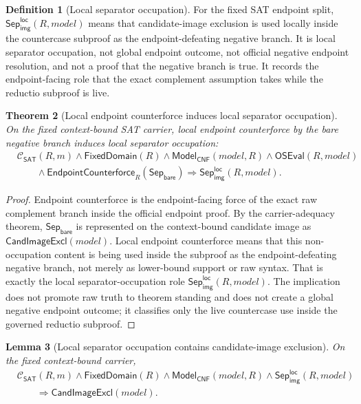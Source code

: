 \documentclass[11pt]{article}
\newtheorem{theorem}{Theorem}[section]
\newtheorem{lemma}[theorem]{Lemma}
\theoremstyle{definition}
\newtheorem{definition}[theorem]{Definition}
\theoremstyle{remark}
\newcommand{\SepBare}{\mathsf{Sep}_{\mathsf{bare}}}
\newcommand{\LocalSepImgOcc}{\mathsf{Sep}_{\mathsf{img}}^{\mathsf{loc}}}
\newcommand{\ClayCtx}{\mathcal{C}_{\mathsf{SAT}}(R,m)}
\newcommand{\FixedDom}{\mathsf{FixedDomain}}
\newcommand{\ModelOfCnf}{\mathsf{Model}_{\mathsf{CNF}}}
\newcommand{\CandImageExcl}{\mathsf{CandImageExcl}}
\newcommand{\OfficialSATEval}{\mathsf{OSEval}}
\newcommand{\EndpointCounterforce}{\mathsf{EndpointCounterforce}}
\begin{document}
\begin{definition}[Local separator occupation]
\label{def:local-separator-occupation}
For the fixed SAT endpoint split, \(\LocalSepImgOcc(R,model)\) means that candidate-image exclusion is used locally inside the countercase subproof as the endpoint-defeating negative branch. It is local separator occupation, not global endpoint outcome, not official negative endpoint resolution, and not a proof that the negative branch is true. It records the endpoint-facing role that the exact complement assumption takes while the reductio subproof is live.
\end{definition}

\begin{theorem}[Local endpoint counterforce induces local separator occupation]
\label{thm:local-counterforce-induces-local-separator-occupation}
On the fixed context-bound SAT carrier, local endpoint counterforce by the bare negative branch induces local separator occupation:
\[
\begin{aligned}
  &\ClayCtx\wedge\FixedDom(R)\wedge\ModelOfCnf(model,R)\wedge\OfficialSATEval(R,model)\\
  &\qquad\wedge\EndpointCounterforce_R(\SepBare)\Rightarrow \LocalSepImgOcc(R,model).
\end{aligned}
\]
\end{theorem}

\begin{proof}
Endpoint counterforce is the endpoint-facing force of the exact raw complement branch inside the official endpoint proof. By the carrier-adequacy theorem, \(\SepBare\) is represented on the context-bound candidate image as \(\CandImageExcl(model)\). Local endpoint counterforce means that this non-occupation content is being used inside the subproof as the endpoint-defeating negative branch, not merely as lower-bound support or raw syntax. That is exactly the local separator-occupation role \(\LocalSepImgOcc(R,model)\). The implication does not promote raw truth to theorem standing and does not create a global negative endpoint outcome; it classifies only the live countercase use inside the governed reductio subproof.
\end{proof}

\begin{lemma}[Local separator occupation contains candidate-image exclusion]
\label{lem:local-separator-occupation-contains-candidate-image-exclusion}
On the fixed context-bound carrier,
\[
\begin{aligned}
  &\ClayCtx\wedge\FixedDom(R)\wedge\ModelOfCnf(model,R)\wedge\LocalSepImgOcc(R,model)\\
  &\qquad\Rightarrow \CandImageExcl(model).
\end{aligned}
\]
\end{lemma}
\end{document}

